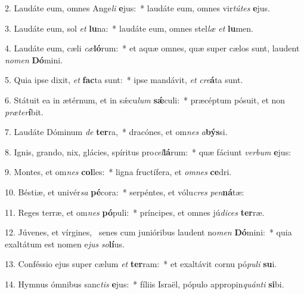 2. Laudáte eum, omnes Ange\textit{li} \textbf{e}jus:~*  laudáte eum, omnes vir\textit{tú}\textit{tes} \textbf{e}jus.\

3. Laudáte eum, sol \textit{et} \textbf{lu}na:~*  laudáte eum, omnes stel\textit{læ} \textit{et} \textbf{lu}men.\

4. Laudáte eum, cæli \textit{cæ}\textbf{ló}rum:~*  et aquæ omnes, quæ super cælos sunt, laudent \textit{no}\textit{men} \textbf{Dó}mini.\

5. Quia ipse dixit, \textit{et} \textbf{fac}ta sunt:~*  ipse mandávit, \textit{et} \textit{cre}\textbf{á}ta sunt.\

6. Státuit ea in ætérnum, et in sǽcu\textit{lum} \textbf{sǽ}culi:~*  præcéptum pósuit, et non \textit{præ}\textit{ter}\textbf{í}bit.\

7. Laudáte Dóminum \textit{de} \textbf{ter}ra,~*  dracónes, et om\textit{nes} \textit{a}\textbf{býs}si.\

8. Ignis, grando, nix, glácies, spíritus pro\textit{cel}\textbf{lá}rum:~*  quæ fáciunt \textit{ver}\textit{bum} \textbf{e}jus:\

9. Montes, et om\textit{nes} \textbf{col}les:~*  ligna fructífera, et \textit{om}\textit{nes} \textbf{ce}dri.\

10. Béstiæ, et univér\textit{sa} \textbf{pé}cora:~*  serpéntes, et vólu\textit{cres} \textit{pen}\textbf{ná}tæ:\

11. Reges terræ, et om\textit{nes} \textbf{pó}puli:~*  príncipes, et omnes jú\textit{di}\textit{ces} \textbf{ter}ræ.\

12. Júvenes, et vírgines, \dag\  senes cum junióribus laudent no\textit{men} \textbf{Dó}mini:~*  quia exaltátum est nomen e\textit{jus} \textit{so}\textbf{lí}us.\

13. Conféssio ejus super cælum \textit{et} \textbf{ter}ram:~*  et exaltávit cornu pó\textit{pu}\textit{li} \textbf{su}i.\

14. Hymnus ómnibus sanc\textit{tis} \textbf{e}jus:~*  fíliis Israël, pópulo appropin\textit{quán}\textit{ti} \textbf{si}bi.\

